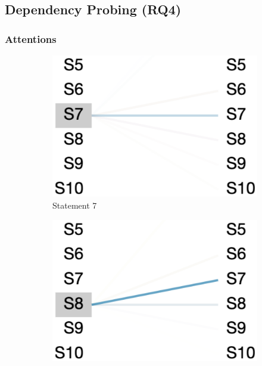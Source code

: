 \subsection{Dependency Probing (RQ4)}
\label{sec:rq4}

\subsubsection{Attentions}
%
%
%

\begin{figure}
     \centering
     \begin{subfigure}[b]{0.15\textwidth}
         \centering
         \includegraphics[width=\textwidth]{sec9-fig1.png}
         \caption{Statement 7}
         \label{fig:stmt-7}
     \end{subfigure}
     \hfill
     \begin{subfigure}[b]{0.15\textwidth}
         \centering
         \includegraphics[width=\textwidth]{sec9-fig2.png}

\end{subfigure}
\end{figure}
